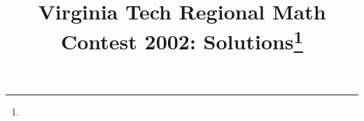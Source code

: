 \documentclass[10pt]{article}
\begin{document}
\title{Virginia Tech Regional Math Contest 2002: Solutions\footnote{\disclaimer}}
\author{\vspace{-2ex}}
\date{\vspace{-5ex}} %
\maketitle

%

%

%

%

%

%

%
\end{document}

